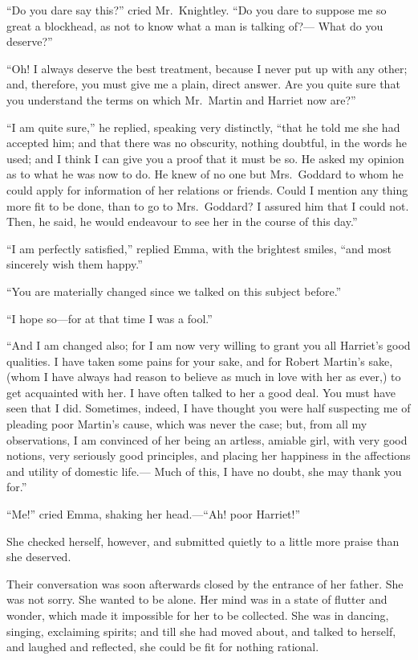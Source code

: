 ``Do you dare say this?'' cried Mr.\ Knightley.  ``Do you dare to suppose
me so great a blockhead, as not to know what a man is talking of?---%
What do you deserve?''

``Oh!  I always deserve the best treatment, because I never put
up with any other; and, therefore, you must give me a plain,
direct answer.  Are you quite sure that you understand the terms
on which Mr.\ Martin and Harriet now are?''

``I am quite sure,'' he replied, speaking very distinctly, ``that he
told me she had accepted him; and that there was no obscurity,
nothing doubtful, in the words he used; and I think I can give you
a proof that it must be so.  He asked my opinion as to what he
was now to do.  He knew of no one but Mrs.\ Goddard to whom he
could apply for information of her relations or friends.  Could I
mention any thing more fit to be done, than to go to Mrs.\ Goddard?
I assured him that I could not.  Then, he said, he would endeavour
to see her in the course of this day.''

``I am perfectly satisfied,'' replied Emma, with the brightest smiles,
``and most sincerely wish them happy.''

``You are materially changed since we talked on this subject before.''

``I hope so---for at that time I was a fool.''

``And I am changed also; for I am now very willing to grant you all
Harriet's good qualities.  I have taken some pains for your sake,
and for Robert Martin's sake, (whom I have always had reason to believe
as much in love with her as ever,) to get acquainted with her.
I have often talked to her a good deal.  You must have seen that
I did.  Sometimes, indeed, I have thought you were half suspecting me
of pleading poor Martin's cause, which was never the case; but, from all
my observations, I am convinced of her being an artless, amiable girl,
with very good notions, very seriously good principles, and placing
her happiness in the affections and utility of domestic life.---%
Much of this, I have no doubt, she may thank you for.''

``Me!'' cried Emma, shaking her head.---``Ah! poor Harriet!''

She checked herself, however, and submitted quietly to a little
more praise than she deserved.

Their conversation was soon afterwards closed by the entrance of
her father.  She was not sorry.  She wanted to be alone.  Her mind
was in a state of flutter and wonder, which made it impossible for her
to be collected.  She was in dancing, singing, exclaiming spirits;
and till she had moved about, and talked to herself, and laughed
and reflected, she could be fit for nothing rational.

